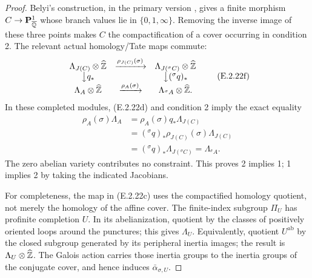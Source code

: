 \begin{proof}
Belyi's construction, in the primary version
\cite[Theorem 1 and old proof, pp.1--2]{GenBelyi1997}, gives a
finite morphism \(C\to\mathbf P^1_{\overline{\mathbb Q}}\) whose branch
values lie in \(\{0,1,\infty\}\). Removing the inverse image
of these three points makes \(C\) the compactification of a
cover occurring in condition 2.
The relevant actual homology/Tate maps commute:
\[
\begin{array}{ccc}
 \Lambda_{J(C)}\otimes\widehat{\mathbb Z}
   &\xrightarrow{\rho_{J(C)}(\sigma)}&
 \Lambda_{J({}^{\sigma}C)}\otimes\widehat{\mathbb Z}\\
 \big\downarrow q_* && \big\downarrow({}^{\sigma}q)_*\\
 \Lambda_A\otimes\widehat{\mathbb Z}
   &\xrightarrow{\rho_A(\sigma)}&
 \Lambda_{{}^{\sigma}A}\otimes\widehat{\mathbb Z}.
\end{array}
 \tag{E.2.22f}
\]
In these completed modules, (E.2.22d) and condition 2 imply
the exact equality
\[
\begin{split}
 \rho_A(\sigma)\Lambda_A
  &=\rho_A(\sigma)q_*\Lambda_{J(C)}\\
  &=({}^{\sigma}q)_*\rho_{J(C)}(\sigma)\Lambda_{J(C)}\\
  &=({}^{\sigma}q)_*\Lambda_{J({}^{\sigma}C)}
    =\Lambda_{{}^{\sigma}A}.
\end{split}
 \tag{E.2.22g}
\]
The zero abelian variety contributes no constraint.
This proves 2 implies 1; 1 implies 2 by taking the indicated
Jacobians.

For completeness, the map in (E.2.22c) uses the compactified
homology quotient, not merely the homology of the affine
cover. The finite-index subgroup \(\Pi_U\) has profinite
completion \(U\). In its abelianization, quotient by the
classes of positively oriented loops around the punctures;
this gives \(\Lambda_U\). Equivalently, quotient
\(U^{\mathrm{ab}}\) by the closed subgroup generated by its
peripheral inertia images; the result is
\(\Lambda_U\otimes\widehat{\mathbb Z}\).
The Galois action carries those inertia groups to the inertia
groups of the conjugate cover, and hence induces
\(\bar\alpha_{\sigma,U}\).


\end{proof}
